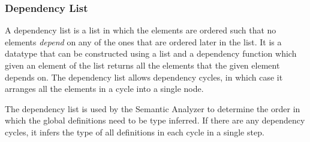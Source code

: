 \documentclass[12pt]{article}
\begin{document}
\subsubsection{Dependency List}

A dependency list is a list in which the elements are ordered such that no
elements \emph{depend} on any of the ones that are ordered later in the list. It
is a datatype that can be constructed using a list and a dependency function
which given an element of the list returns all the elements that the given
element depends on. The dependency list allows dependency cycles, in which case
it arranges all the elements in a cycle into a single node.

The dependency list is used by the Semantic Analyzer to determine the order in
which the global definitions need to be type inferred. If there are any
dependency cycles, it infers the type of all definitions in each cycle in a
single step.
\end{document}
